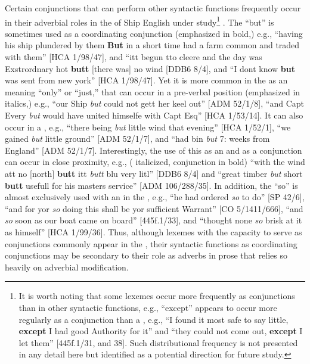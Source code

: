 Certain conjunctions that can perform other syntactic functions frequently occur in their adverbial roles in the  of Ship English under study\footnote{It is worth noting that some lexemes occur more frequently as conjunctions than in other syntactic functions, e.g., “except” appears to occur more regularly as a conjunction than a , e.g., “I found it most safe to say little, \textbf{except} I had good Authority for it” and “they could not come out, \textbf{except} I let them” [445f.1/31, and 38]. Such distributional frequency is not presented in any detail here but identified as a potential direction for future study.} . The  “but” is sometimes used as a coordinating conjunction (emphasized in bold,) e.g., “having his ship plundered by them \textbf{But} in a short time had a farm common and traded with them” [HCA 1/98/47], and “itt begun tto cleere and the day was Exstrordnary hot \textbf{butt} [there was] no wind [DDB6 8/4], and “I dont know \textbf{but} was sent from new york” [HCA 1/98/47]. Yet it is more common in the  as an  meaning “only” or “just,” that can occur in a pre-verbal position (emphasized in italics,) e.g., “our Ship \textit{but} could not gett her keel out” [ADM 52/1/8], “and Capt Every \textit{but} would have united himselfe with Capt Esq” [HCA 1/53/14]. It can also occur in a , e.g., “there being \textit{but} little wind that evening” [HCA 1/52/1], “we gained \textit{but} little ground” [ADM 52/1/7], and “had bin \textit{but} 7: weeks from England” [ADM 52/1/7]. Interestingly, the use of this  as an  and as a conjunction can occur in close proximity, e.g., ( italicized, conjunction in bold) “with the wind att no [north] \textbf{butt} itt \textit{butt} blu very litl” [DDB6 8/4] and “great timber \textit{but} short \textbf{butt} usefull for his masters service” [ADM 106/288/35]. In addition, the  “so” is almost exclusively used with an  in the , e.g., “he had ordered \textit{so} to do” [SP 42/6], “and for yor \textit{so} doing this shall be yor sufficient Warrant” [CO 5/1411/666], “and \textit{so} soon as our boat came on board” [445f.1/33], and “thought none \textit{so} brisk at it as himself” [HCA 1/99/36]. Thus, although lexemes with the capacity to serve as conjunctions commonly appear in the , their syntactic functions as coordinating conjunctions may be secondary to their role as adverbs in prose that relies so heavily on adverbial modification. 

